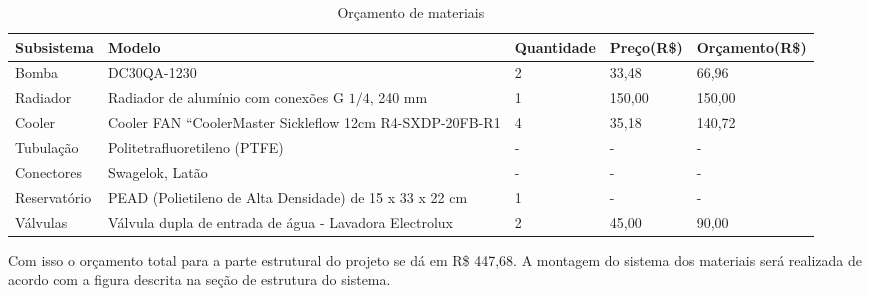 \begin{table}[htb]
\begin{tabular}{|p{3cm}|p{4cm}|p{3cm}|p{2cm}|p{3cm}|}
\hline
Subsistema & Modelo & Quantidade & Preço(R\$) & Orçamento(R\$) \\
\hline
Bomba & DC30QA-1230  & 2 & 33,48 & 66,96 \\ \hline
Radiador & Radiador de alumínio com conexões G $1/4$, 240 mm & 1 & 150,00 & 150,00\\ \hline
Cooler & Cooler FAN “CoolerMaster Sickleflow 12cm R4-SXDP-20FB-R1 & 4 & 35,18 & 140,72\\ \hline
Tubulação & Politetrafluoretileno (PTFE) & - & - & -\\ \hline
Conectores & Swagelok, Latão & - & -  & - \\ \hline
Reservatório & PEAD (Polietileno de Alta Densidade) de 15 x 33 x 22 cm & 1 & - & - \\ \hline
Válvulas & Válvula dupla de entrada de água - Lavadora Electrolux  & 2 & 45,00 & 90,00\\ \hline
\hline
\end{tabular}
\caption{Orçamento de materiais}
\end{table}

Com isso o orçamento total para a parte estrutural do projeto se dá em R\$ 447,68.
A montagem do sistema dos materiais será realizada de acordo com a figura descrita na seção de estrutura do sistema.